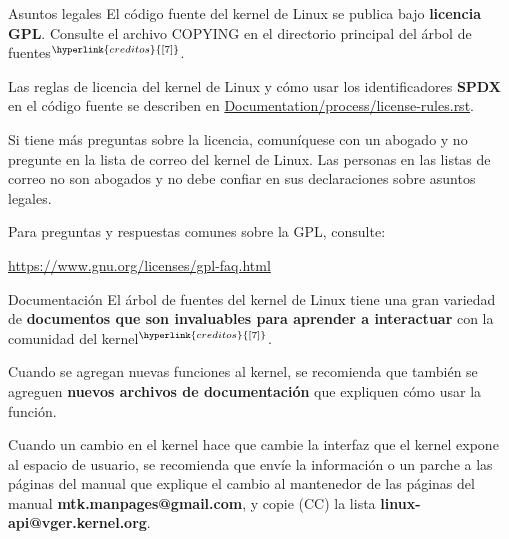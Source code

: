 \begin{frame}[c]{Asuntos legales}
  El código fuente del kernel de Linux se publica bajo \textbf{licencia GPL}.
  Consulte el archivo COPYING en el directorio principal del árbol de
  fuentes$^{\hyperlink{creditos}{[7]}}$.

  \vspace{\baselineskip}
  Las reglas de licencia del kernel de Linux y cómo usar los identificadores
  \textbf{SPDX} en el código fuente se describen en
  \href{https://git.kernel.org/pub/scm/linux/kernel/git/torvalds/linux.git/tree/Documentation/process/license-rules.rst}
  {Documentation/process/license-rules.rst}.

  \vspace{\baselineskip}
  Si tiene más preguntas sobre la licencia, comuníquese con un abogado y no
  pregunte en la lista de correo del kernel de Linux. Las personas en las
  listas de correo no son abogados y no debe confiar en sus declaraciones
  sobre asuntos legales.

  \vspace{\baselineskip}
  Para preguntas y respuestas comunes sobre la GPL, consulte:

  \vspace{\baselineskip}
  \href{https://www.gnu.org/licenses/gpl-faq.html}
  {https://www.gnu.org/licenses/gpl-faq.html}
\end{frame}

\begin{frame}[c]{Documentación}
  El árbol de fuentes del kernel de Linux tiene una gran variedad de
  \textbf{documentos que son invaluables para aprender a interactuar} con la
  comunidad del kernel$^{\hyperlink{creditos}{[7]}}$.

  \vspace{\baselineskip}
  Cuando se agregan nuevas funciones al kernel, se recomienda que también
  se agreguen \textbf{nuevos archivos de documentación} que expliquen cómo
  usar la función.

  \vspace{\baselineskip}
  Cuando un cambio en el kernel hace que cambie la interfaz que el kernel
  expone al espacio de usuario, se recomienda que envíe la información o
  un parche a las páginas del manual que explique el cambio al mantenedor
  de las páginas del manual \textbf{mtk.manpages@gmail.com},
  y copie (CC) la lista
  \textbf{linux-api@vger.kernel.org}.
\end{frame}

